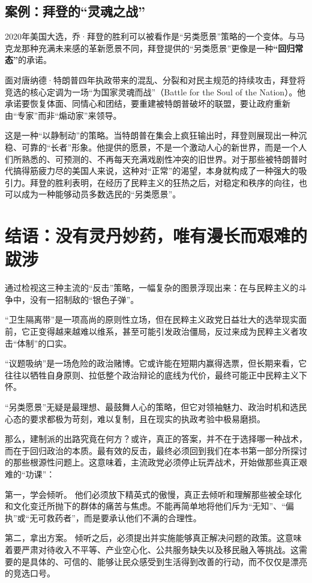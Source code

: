 \subsection{案例：拜登的“灵魂之战”}

2020年美国大选，乔·拜登的胜利可以被看作是“另类愿景”策略的一个变体。与马克龙那种充满未来感的革新愿景不同，拜登提供的“另类愿景”更像是一种\textbf{“回归常态”}的承诺。

面对唐纳德·特朗普四年执政带来的混乱、分裂和对民主规范的持续攻击，拜登将竞选的核心定调为一场“为国家灵魂而战”（Battle for the Soul of the Nation）。他承诺要恢复体面、同情心和团结，要重建被特朗普破坏的联盟，要让政府重新由“专家”而非“煽动家”来领导。

这是一种“以静制动”的策略。当特朗普在集会上疯狂输出时，拜登则展现出一种沉稳、可靠的“长者”形象。他提供的愿景，不是一个激动人心的新世界，而是一个人们所熟悉的、可预测的、不再每天充满戏剧性冲突的旧世界。对于那些被特朗普时代搞得筋疲力尽的美国人来说，这种对“正常”的渴望，本身就构成了一种强大的吸引力。拜登的胜利表明，在经历了民粹主义的狂热之后，对稳定和秩序的向往，也可以成为一种能够动员多数选民的“另类愿景”。

\section{结语：没有灵丹妙药，唯有漫长而艰难的跋涉}
通过检视这三种主流的“反击”策略，一幅复杂的图景浮现出来：在与民粹主义的斗争中，没有一招制敌的“银色子弹”。

“卫生隔离带”是一项高尚的原则性立场，但在民粹主义政党日益壮大的选举现实面前，它正变得越来越难以维系，甚至可能引发政治僵局，反过来成为民粹主义者攻击“体制”的口实。

“议题吸纳”是一场危险的政治赌博。它或许能在短期内赢得选票，但长期来看，它往往以牺牲自身原则、拉低整个政治辩论的底线为代价，最终可能正中民粹主义下怀。

“另类愿景”无疑是最理想、最鼓舞人心的策略，但它对领袖魅力、政治时机和选民心态的要求都极为苛刻，难以复制，且在现实的执政考验中极易磨损。

那么，建制派的出路究竟在何方？或许，真正的答案，并不在于选择哪一种战术，而在于回归政治的本质。最有效的反击，最终必须回到我们在本书第一部分所探讨的那些根源性问题上。这意味着，主流政党必须停止玩弄战术，开始做那些真正艰难的“功课”：

第一，学会倾听。 他们必须放下精英式的傲慢，真正去倾听和理解那些被全球化和文化变迁所抛下的群体的痛苦与焦虑。不能再简单地将他们斥为“无知”、“偏执”或“无可救药者”，而是要承认他们不满的合理性。

第二，拿出方案。 倾听之后，必须提出并实施能够真正解决问题的政策。这意味着要严肃对待收入不平等、产业空心化、公共服务缺失以及移民融入等挑战。这需要的是具体的、可信的、能够让民众感受到生活得到改善的行动，而不仅仅是漂亮的竞选口号。

